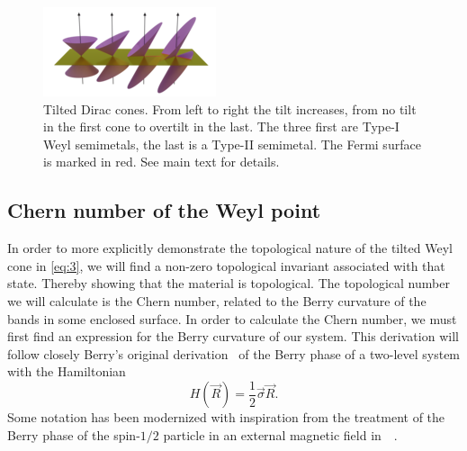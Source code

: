 \begin{figure}[p!]
  \centering
  \includegraphics[width=\textwidth]{figures/cones-tilt-color1-small.png}
  \caption{Tilted Dirac cones.
    From left to right the tilt increases, from no tilt in the first cone to overtilt in the last.
    The three first are Type-I Weyl semimetals, the last is a Type-II semimetal.
    The Fermi surface is marked in red.
    See main text for details.
    \label{fig:tilted-cones}
  }
  \label{fig:tiltcone}
\end{figure}

\subsection{Chern number of the Weyl point}\label{sec:chern-number-weyl}
In order to more explicitly demonstrate the topological nature of the tilted Weyl cone in \cref{eq:3}, we will find a non-zero topological invariant associated with that state.
Thereby showing that the material is topological.
The topological number we will calculate is the Chern number, related to the Berry curvature of the bands in some enclosed surface.
In order to calculate the Chern number, we must first find an expression for the Berry curvature of our system.
This derivation will follow closely Berry's original derivation~\cite{berryQuantalPhaseFactors1984} of the Berry phase of a two-level system with the Hamiltonian
\begin{equation}
  \label{eq:6}
  H(\vec{R}) = \frac12 \vec\sigma \vec{R}.
\end{equation}
Some notation has been modernized with inspiration from the treatment of the Berry phase of the spin-$1 /2$ particle in an external magnetic field in~\citeauthor{holsteinAdiabaticTheoremBerry1989}~\cite{holsteinAdiabaticTheoremBerry1989}.

